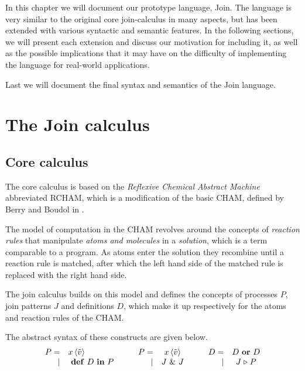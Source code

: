 
In this chapter we will document our prototype language, Join.  The
language is very similar to the original core join-calculus in many
aspects, but has been extended with various syntactic and semantic
features. In the following sections, we will present each extension
and discuss our motivation for including it, as well as the possible
implications that it may have on the difficulty of implementing the
language for real-world applications.

Last we will document the final syntax and semantics of the Join
language.

\section{The Join calculus}
\subsection{Core calculus}

The core calculus is based on the \emph{Reflexive Chemical Abstract Machine}
abbreviated RCHAM, which is a modification of the basic CHAM, defined by Berry
and Boudol in \cite{berry1989chemical}.

The model of computation in the CHAM revolves around the concepts of
\emph{reaction rules} that manipulate \emph{atoms and molecules} in a
\emph{solution}, which is a term comparable to a program. As atoms enter the
solution they recombine until a reaction rule is matched, after which the left
hand side of the matched rule is replaced with the right hand side.

The join calculus builds on this model and defines the concepts of processes
$P$, join patterns $J$ and definitions $D$, which make it up respectively for
the atoms and reaction rules of the CHAM.

The abstract syntax of these constructs are given below.
\begin{displaymath}
\begin{array}{rl}
  P =& \atm x < \tilde v > \\
 |& \defJ D \inJ P
\end{array}\qquad
\begin{array}{rc}
  P =& \atm x < \tilde v > \\
 |& J \andJ J
\end{array}\qquad
\begin{array}{rc}
  D =& D \orJ D \\
 |& J \toJ{} P
\end{array}
\end{displaymath}

